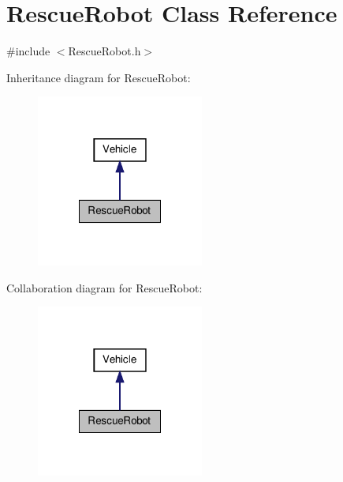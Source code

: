 \hypertarget{class_rescue_robot}{\section{Rescue\-Robot Class Reference}
\label{class_rescue_robot}
}


{\ttfamily \#include $<$Rescue\-Robot.\-h$>$}



Inheritance diagram for Rescue\-Robot\-:\nopagebreak
\begin{figure}[H]
\begin{center}
\leavevmode
\includegraphics[width=156pt]{class_rescue_robot__inherit__graph}
\end{center}
\end{figure}


Collaboration diagram for Rescue\-Robot\-:\nopagebreak
\begin{figure}[H]
\begin{center}
\leavevmode
\includegraphics[width=156pt]{class_rescue_robot__coll__graph}
\end{center}
\end{figure}
